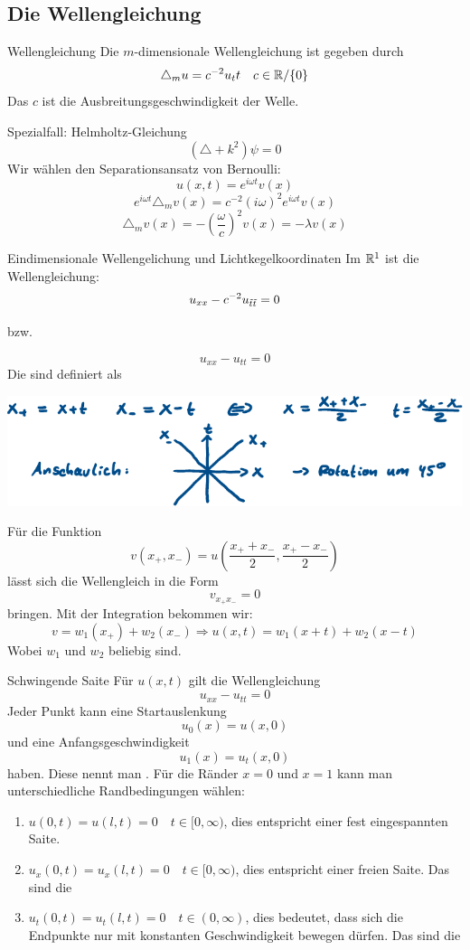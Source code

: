 \subsection{Die Wellengleichung}
\begin{Def}{Wellengleichung}
    Die $m$-dimensionale Wellengleichung ist gegeben durch
    $$\triangle_m u = c^{-2}u_tt\quad c\in \mathbb{R}/ \{0\}$$
    Das $c$ ist die Ausbreitungsgeschwindigkeit der Welle.
\end{Def}
\begin{Beispiel}{Spezialfall: Helmholtz-Gleichung}
$$(\triangle + k^2)\psi = 0$$
Wir wählen den Separationsansatz von Bernoulli:
$$u(x,t)=e^{i\omega t}v(x)$$
$$e^{i\omega t}\triangle_m v(x)=c^{-2}(i\omega)^2e^{i\omega t}v(x)$$
$$\triangle_mv(x)=-(\frac{\omega}{c})^2v(x)=-\lambda v(x)$$
\end{Beispiel}
\begin{Def}{Eindimensionale Wellengelichung und Lichtkegelkoordinaten}
Im $\mathbb{R}^1$ ist die Wellengleichung: $$u_{xx}-c^{-2}u_{\Tilde{t}\Tilde{t}}=0$$
\begin{center}
    bzw.
\end{center}
    $$u_{xx}-u_{tt}=0$$
    Die  sind definiert als
\begin{center}
    \includegraphics[width=.90\textwidth]{Dateien/Lichtkegel.pdf}
\end{center}
    Für die Funktion
    $$v(x_+, x_-)= u(\frac{x_++x_-}{2}, \frac{x_+-x_-}{2})$$
    lässt sich die Wellengleich in die Form
    $$v_{x_+x_-}=0$$
    bringen. Mit der Integration bekommen wir:
    $$v=w_1(x_+)+w_2(x_-) \Rightarrow u(x,t) = w_1(x+t)+w_2(x-t)$$
    Wobei $w_1$ und $w_2$ beliebig sind.
\end{Def}
\begin{Def}{Schwingende Saite}
    Für $u(x,t)$ gilt die Wellengleichung
    $$u_{xx}-u_{tt}=0$$
    Jeder Punkt kann eine Startauslenkung
    $$u_0(x)=u(x,0)$$
    und eine Anfangsgeschwindigkeit
    $$u_1(x)=u_t(x,0)$$
    haben. Diese nennt man . Für die Ränder $x=0$ und $x=1$ kann man unterschiedliche Randbedingungen wählen:
    \begin{enumerate}
        \item $u(0,t)=u(l,t)=0 \quad t\in [0,\infty)$, dies entspricht einer fest eingespannten Saite.
        \item $u_x(0,t)=u_x(l,t)=0 \quad t\in [0,\infty)$, dies entspricht einer freien Saite. Das sind die 
        \item $u_t(0,t)=u_t(l,t)=0 \quad t\in(0,\infty)$, dies bedeutet, dass sich die Endpunkte nur mit konstanten Geschwindigkeit bewegen dürfen. Das sind die 
    \end{enumerate}
\end{Def}
